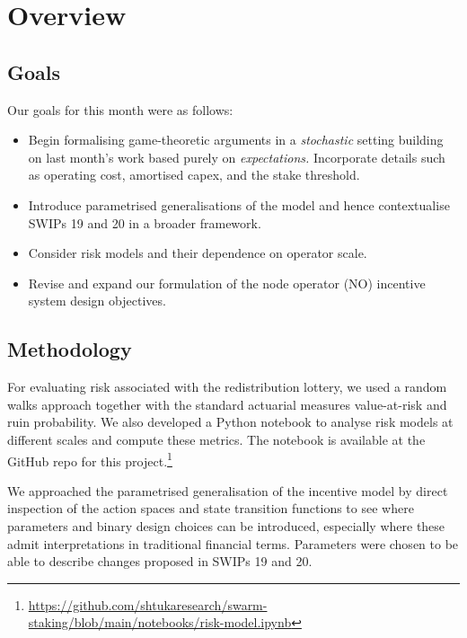 \maketitle
\section*{Overview}

\subsection*{Goals}

Our goals for this month were as follows: 

\begin{itemize}
  \item 
    Begin formalising game-theoretic arguments in a {\em stochastic} setting building on last month's work based purely on {\em expectations.}
    Incorporate details such as operating cost, amortised capex, and the stake threshold.
  \item
    Introduce parametrised generalisations of the model and hence contextualise SWIPs 19 and 20 in a broader framework.
  \item 
    Consider risk models and their dependence on operator scale.
  \item
    Revise and expand our formulation of the node operator (NO) incentive system design objectives.
\end{itemize}

\subsection*{Methodology}

For evaluating risk associated with the redistribution lottery, we used a random walks approach together with the standard actuarial measures value-at-risk and ruin probability.
%
We also developed a Python notebook to analyse risk models at different scales and compute these metrics. The notebook is available at the GitHub repo for this project.\footnote{\url{https://github.com/shtukaresearch/swarm-staking/blob/main/notebooks/risk-model.ipynb}}

We approached the parametrised generalisation of the incentive model by direct inspection of the action spaces and state transition functions to see where parameters and binary design choices can be introduced, especially where these admit interpretations in traditional financial terms. 
%
Parameters were chosen to be able to describe changes proposed in SWIPs 19 and 20.


